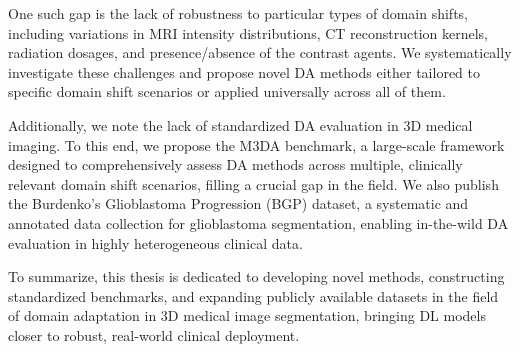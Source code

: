 One such gap is the lack of robustness to particular types of domain shifts, including variations in MRI intensity distributions, CT reconstruction kernels, radiation dosages, and presence/absence of the contrast agents. We systematically investigate these challenges and propose novel DA methods either tailored to specific domain shift scenarios or applied universally across all of them.

Additionally, we note the lack of standardized DA evaluation in 3D medical imaging. To this end, we propose the M3DA benchmark, a large-scale framework designed to comprehensively assess DA methods across multiple, clinically relevant domain shift scenarios, filling a crucial gap in the field. We also publish the Burdenko's Glioblastoma Progression (BGP) dataset, a systematic and annotated data collection for glioblastoma segmentation, enabling in-the-wild DA evaluation in highly heterogeneous clinical data.

To summarize, this thesis is dedicated to developing novel methods, constructing standardized benchmarks, and expanding publicly available datasets in the field of domain adaptation in 3D medical image segmentation, bringing DL models closer to robust, real-world clinical deployment.


%
%
%


